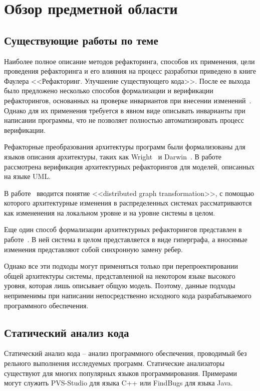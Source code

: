 \chapter{Обзор предметной области}
\section{Существующие работы по теме}
Наиболее полное описание методов рефакторинга, способов их применения, цели проведения рефакторинга и его влияния на процесс разработки
приведено в книге Фаулера <<Рефакторинг. Улучшение существующего кода>>.
После ее выхода было предложено несколько способов формализации и верификации рефакторингов,
основанных на проверке инвариантов при внесении изменений~\cite{Rustan04objectinvariants, DBLP:journals/eceasst/MassoniGB06}.
Однако для их применения требуется в явном виде описывать инварианты при написании программы,
что не позволяет полностью автоматизировать процесс верификации.

Рефакторные преобразования архитектуры программ были формализованы для языков описания архитектуры,
таких как Wright~\cite{Allen98specifyingand} и Darwin~\cite{Ehrig:2006:FAG:1121741}.
В работе~\cite{Bisztray_verificationof} рассмотрена верификация архитектурных рефакторингов для моделей,
описанных на языке UML.

В работе~\cite{Taentzer:1998:DCM:645872.668868} вводится понятие <<distributed graph transformation>>,
с помощью которого архитектурные изменения в распределенных системах рассматриваются как
измененения на локальном уровне и на уровне системы в целом.

Еще один способ формализации архитектурных рефакторингов представлен в работе~\cite{Hirsch:1998:GGC:288408.288426}.
В ней система в целом представляется в виде гиперграфа, а вносимые изменения
представляют собой синхронную замену ребер.

Однако все эти подходы могут применяться только при перепроектировании общей архитектуры системы,
представленной на некотором языке высокого уровня, которая лишь описывает общую модель.
Поэтому, данные подходы неприменимы при написании непосредственно исходного кода разрабатываемого программного обеспечения.

\section{Статический анализ кода}
Статический анализ кода -- анализ программного обеспечения, проводимый без рельного выполнения исследуемых программ.
Статические анализаторы существуют для многих популярных языков программирования.
Примерами могут служить PVS-Studio для языка C++ или FindBugs для языка Java.

